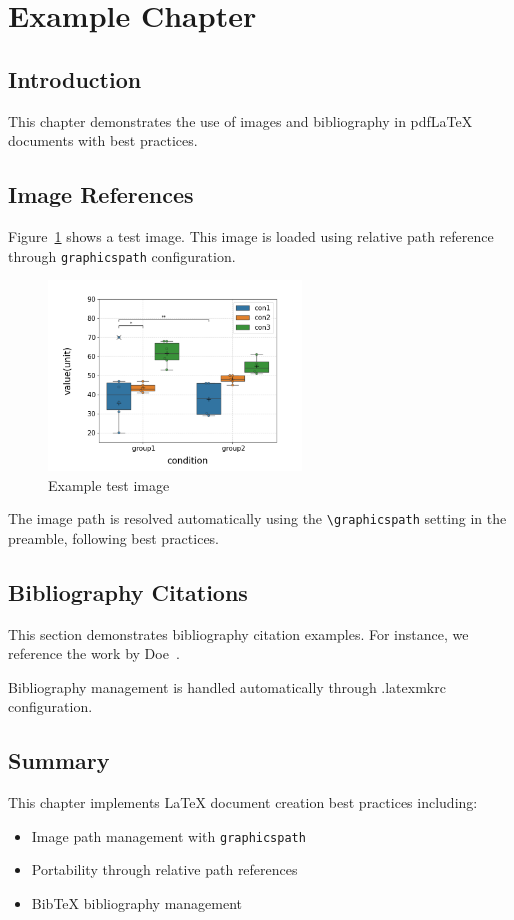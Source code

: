 \section{Example Chapter}

\subsection{Introduction}

This chapter demonstrates the use of images and bibliography in pdfLaTeX documents with best practices.

\subsection{Image References}

Figure~\ref{fig:test_image_pdf} shows a test image. This image is loaded using relative path reference through \texttt{graphicspath} configuration.

\begin{figure}[htbp]
    \centering
    \includegraphics[width=0.6\textwidth]{figures/test/test.png}
    \caption{Example test image}
    \label{fig:test_image_pdf}
\end{figure}

The image path is resolved automatically using the \texttt{\textbackslash graphicspath} setting in the preamble, following best practices.

\subsection{Bibliography Citations}

This section demonstrates bibliography citation examples. For instance, we reference the work by Doe~\cite{example}.

Bibliography management is handled automatically through .latexmkrc configuration.

\subsection{Summary}

This chapter implements LaTeX document creation best practices including:

\begin{itemize}
    \item Image path management with \texttt{graphicspath}
    \item Portability through relative path references
    \item BibTeX bibliography management
\end{itemize}
